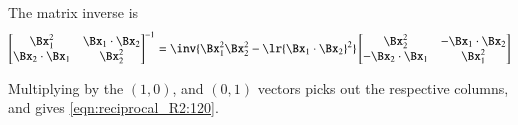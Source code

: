 {The matrix inverse is
\begin{dmath}\label{eqn:2dreciprocalMatrixCalculation:240}
{
\begin{bmatrix}
\Bx_1^2 & \Bx_1 \cdot \Bx_2 \\
\Bx_2 \cdot \Bx_1 & \Bx_2^2 \\
\end{bmatrix}
}^{-1}
=
\inv{ \Bx_1^2 \Bx_2^2 - \lr{\Bx_1 \cdot \Bx_2}^2 }
\begin{bmatrix}
\Bx_2^2 & -\Bx_1 \cdot \Bx_2 \\
-\Bx_2 \cdot \Bx_1 & \Bx_1^2 \\
\end{bmatrix}
\end{dmath}

Multiplying by the \( (1,0) \), and \( (0,1) \) vectors picks out the respective columns, and gives \cref{eqn:reciprocal_R2:120}.
} %
